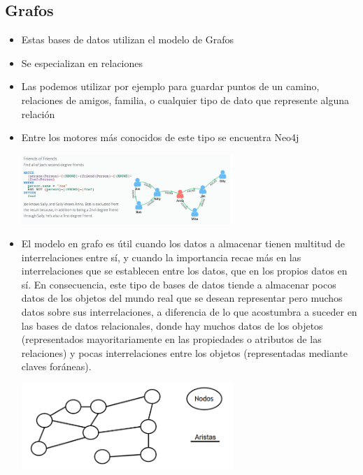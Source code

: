 \documentclass[%
 reprint,
 amsmath,amssymb,
 aps,
]{revtex4-1}
\begin{document}
\subsection{Grafos}
\begin{itemize}
		\item Estas bases de datos utilizan el modelo de Grafos
		\item Se especializan en relaciones
		\item Las podemos utilizar por ejemplo para guardar puntos de un camino, relaciones de amigos, familia, o cualquier tipo de  dato que represente alguna relación
                     \item Entre los motores más conocidos de este tipo se encuentra Neo4j
                     \begin{center}
		\includegraphics[width=8cm]{./Imagenes/4}
		\end{center}	
		
		\item El modelo en grafo es útil cuando los datos a almacenar tienen multitud de interrelaciones entre sí, y cuando la importancia recae más en las interrelaciones que se establecen entre los datos, que en los propios datos en sí. En consecuencia, este tipo de bases de datos tiende a almacenar pocos datos de los objetos del mundo real que se desean representar pero muchos datos sobre sus interrelaciones, a diferencia de lo que acostumbra a suceder en las bases de datos relacionales, donde hay muchos datos de los objetos (representados mayoritariamente en las propiedades o atributos de las relaciones) y pocas interrelaciones entre los objetos (representadas mediante claves foráneas).
		\begin{center}
		\includegraphics[width=8cm]{./Imagenes/grafos1}
		\end{center}	
		
		
		
	          \end{itemize}
	          
\end{document}
